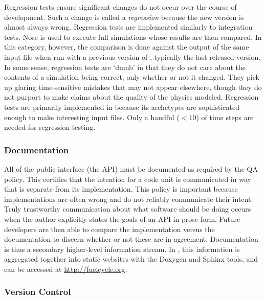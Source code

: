Regression tests ensure significant changes do not
occur over the course of \Cyclus development. Such a change is called a
\emph{regression} because the new version is almost always wrong.
Regression tests are implemented similarly to integration tests.
Nose is used to execute full \Cyclus simulations whose results
are then compared. In this category, however, the comparison is done against
the output of the same input file when run with a previous version of \Cyclus,
typically the last released version.
In some sense, regression tests are `dumb' in that they do
not care about the contents of a simulation being correct, only whether or not
it changed. They pick up glaring time-sensitive mistakes that may
not appear elsewhere, though they do not purport to make claims about the
quality of the physics modeled. Regression tests are primarily implemented
in \Cycamore because its archetypes are sophisticated enough
to make interesting input files. Only a handful ($<10$) of time steps are needed
for regression testing.

\subsubsection{Documentation}

All of the public interface (the \gls{API}) must be documented as required by the \Cyclus
\gls{QA} policy. This certifies that the intention for a code unit is communicated
in way that is separate from its implementation. This policy is important
because implementations are often wrong and do not reliably communicate their intent. Truly trustworthy communication about what
software should be doing occurs when the author explicitly states the
goals of an \gls{API} in prose form. Future developers are then able to
compare the implementation versus the documentation to discern whether or not
these are in agreement. Documentation is thus a secondary higher-level information
stream.  In \Cyclus, this information is aggregated together into static
websites with the Doxygen \cite{van_heesch_doxygen:_2008} and Sphinx
\cite{brandl_sphinx_2014}
tools, and can be accessed at \url{http://fuelcycle.org}.

\subsubsection{Version Control}

